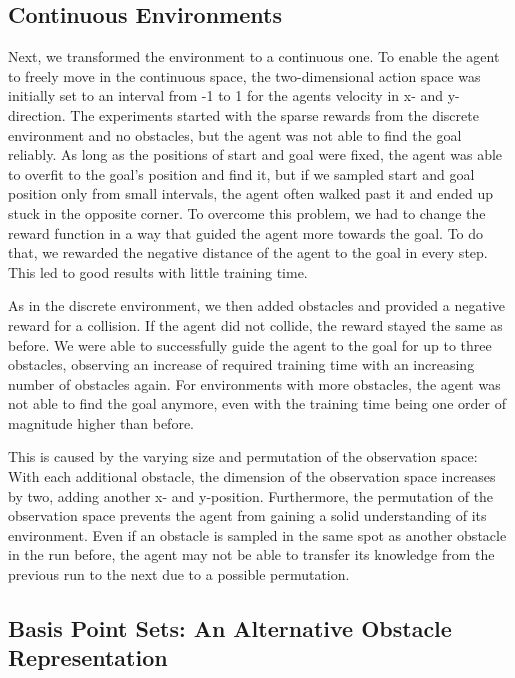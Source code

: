 \documentclass[conference]{IEEEtran}
\begin{document}
\subsection{Continuous Environments}

Next, we transformed the environment to a continuous one. To enable the agent to freely move in the continuous space, the two-dimensional action space was initially set to an interval from -1 to 1 for the agents velocity in x- and y- direction. The experiments started with the sparse rewards from the discrete environment and no obstacles, but the agent was not able to find the goal reliably. As long as the positions of start and goal were fixed, the agent was able to overfit to the goal's position and find it, but if we sampled start and goal position only from small intervals, the agent often walked past it and ended up stuck in the opposite corner. To overcome this problem, we had to change the reward function in a way that guided the agent more towards the goal. To do that, we rewarded the negative distance of the agent to the goal in every step. This led to good results with little training time.

As in the discrete environment, we then added obstacles and provided a negative reward for a collision. If the agent did not collide, the reward stayed the same as before. We were able to successfully guide the agent to the goal for up to three obstacles, observing an increase of required training time with an increasing number of obstacles again. For environments with more obstacles, the agent was not able to find the goal anymore, even with the training time being one order of magnitude higher than before.

This is caused by the varying size and permutation of the observation space: With each additional obstacle, the dimension of the observation space increases by two, adding another x- and y-position. Furthermore, the permutation of the observation space prevents the agent from gaining a solid understanding of its environment. Even if an obstacle is sampled in the same spot as another obstacle in the run before, the agent may not be able to transfer its knowledge from the previous run to the next due to a possible permutation.

\subsection{Basis Point Sets: An Alternative Obstacle Representation}
\end{document}
